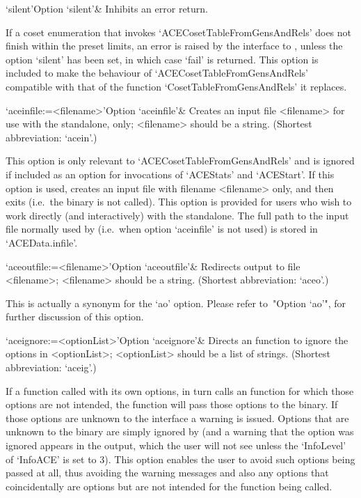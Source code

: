 \>`silent'{Option `silent'}& 
Inhibits an error return.

If a coset  enumeration  that  invokes  `ACECosetTableFromGensAndRels'
does not finish within the preset limits, an error is  raised  by  the
interface to {\GAP}, unless the option `silent' has been set, in which
case `fail' is returned. This option is included to make the behaviour
of `ACECosetTableFromGensAndRels' compatible with that of the function
`CosetTableFromGensAndRels' it replaces.

\>`aceinfile:=<filename>'{Option `aceinfile'}&
Creates an {\ACE} input file <filename> for use with  the  standalone,
only;  <filename>  should  be  a  string.
(Shortest abbreviation: `acein'.)

This option is only relevant to `ACECosetTableFromGensAndRels' and  is
ignored if included as an option for  invocations  of  `ACEStats'  and
`ACEStart'. If this option is used, {\GAP} creates an input file  with
filename <filename> only, and then exits (i.e.~the  {\ACE}  binary  is
not called). This option is  provided  for  users  who  wish  to  work
directly (and interactively) with the {\ACE} standalone. The full path
to  the  input  file  normally  used  by  {\ACE}   (i.e.~when   option
`aceinfile' is not used) is stored in `ACEData.infile'.


\>`aceoutfile:=<filename>'{Option `aceoutfile'}&
Redirects {\ACE} output to file <filename>;  <filename>  should  be  a
string. (Shortest abbreviation: `aceo'.)

This  is  actually  a  synonym  for  the  `ao'  option.  Please  refer
to~"Option `ao'", for further discussion of this option.

\>`aceignore:=<optionList>'{Option `aceignore'}&
Directs an {\ACE} function to  ignore  the  options  in  <optionList>;
<optionList> should be a list of strings.
(Shortest abbreviation: `aceig'.)

If a function called with its own options, in  turn  calls  an  {\ACE}
function for which those options are not intended, the {\ACE} function
will pass those options to the {\ACE} binary.  If  those  options  are
unknown to the {\ACE} interface a warning is issued. Options that  are
unknown to the {\ACE} binary are  simply  ignored  by  {\ACE}  (and  a
warning that the option was ignored  appears  in  the  {\ACE}  output,
which the user will not see unless the `InfoLevel' of `InfoACE' is set
to 3). This option enables the user to avoid such options being passed
at all, thus avoiding the warning messages and also any  options  that
coincidentally are {\ACE} options but are not intended for the  {\ACE}
function being called.

